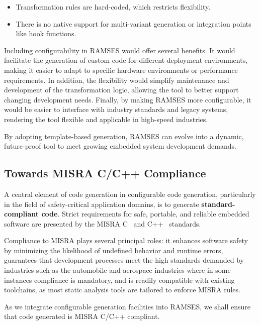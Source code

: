 \begin{itemize} 
	\item Transformation rules are hard-coded, which restricts flexibility.
	\item There is no native support for multi-variant generation or integration points like hook functions. 
\end{itemize}

Including configurability in RAMSES would offer several benefits. It would facilitate the generation of custom code for different deployment environments, making it easier to adapt to specific hardware environments or performance requirements. In addition, the flexibility would simplify maintenance and development of the transformation logic, allowing the tool to better support changing development needs. Finally, by making RAMSES more configurable, it would be easier to interface with industry standards and legacy systems, rendering the tool flexible and applicable in high-speed industries.

\begin{tcolorbox}[colback=green!5, colframe=green!40!black] By adopting template-based generation, RAMSES can evolve into a dynamic, future-proof tool to meet growing embedded system development demands. \end{tcolorbox}

\subsection*{Towards MISRA C/C++ Compliance}

A central element of code generation in configurable code generation, particularly in the field of safety-critical application domains, is to generate \textbf{standard-compliant code}. Strict requirements for safe, portable, and reliable embedded software are presented by the \gls{MISRA} C~\cite{Misra_C_2025} and C++~\cite{Misra_Cpp_2023} standards.
\par
Compliance to \gls{MISRA} plays several principal roles: it enhances software safety by minimizing the likelihood of undefined behavior and runtime errors, guarantees that development processes meet the high standards demanded by industries such as the automobile and aerospace industries where in some instances compliance is mandatory, and is readily compatible with existing toolchains, as most static analysis tools are tailored to enforce \gls{MISRA} rules.
\par
As we integrate configurable generation facilities into RAMSES, we shall ensure that code generated is \gls{MISRA} C/C++ compliant.

